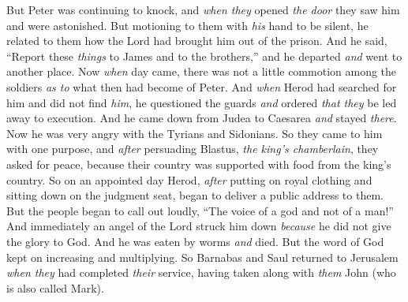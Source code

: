 \begin{biblechapter}
\verse But Peter was continuing to knock, and \textit{when they} opened \textit{the door} they saw him and were astonished.
\verse But motioning to them with \textit{his} hand to be silent, he related to them how the Lord had brought him out of the prison. And he said, “Report these \textit{things} to James and to the brothers,” and he departed \textit{and} went to another place.
\verse Now \textit{when} day came, there was not a little commotion among the soldiers \textit{as to} what then had become of Peter.
\verse And \textit{when} Herod had searched for him and did not find \textit{him}, he questioned the guards \textit{and} ordered \textit{that they} be led away to execution. And he came down from Judea to Caesarea \textit{and} stayed \textit{there}.
 Now he was very angry with the Tyrians and Sidonians. So they came to him with one purpose, and \textit{after} persuading Blastus, \textit{the king’s chamberlain}, they asked for peace, because their country was supported with food from the king’s country.
\verse So on an appointed day Herod, \textit{after} putting on royal clothing and sitting down on the judgment seat, began to deliver a public address to them.
\verse But the people began to call out loudly, “The voice of a god and not of a man!”
\verse And immediately an angel of the Lord struck him down \textit{because} he did not give the glory to God. And he was eaten by worms \textit{and} died.
\verse But the word of God kept on increasing and multiplying.
\verse So Barnabas and Saul returned to Jerusalem \textit{when they} had completed \textit{their} service, having taken along with \textit{them} John (who is also called Mark).
\end{biblechapter}

